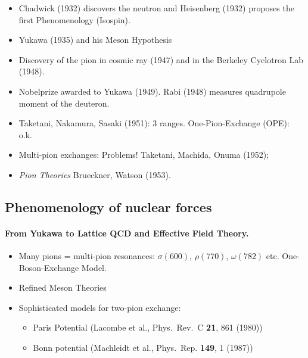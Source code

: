 \documentclass[%
twoside,                 %
final,                   %
10pt]{article}
\begin{document}
\begin{itemize}
\item Chadwick (1932) discovers the neutron and Heisenberg (1932) proposes the first Phenomenology (Isospin).  

\item Yukawa (1935) and his Meson Hypothesis       

\item Discovery of the pion in cosmic ray (1947) and in the Berkeley Cyclotron Lab (1948).

\item Nobelprize awarded to Yukawa (1949).  Rabi (1948) measures quadrupole moment of the deuteron.

\item Taketani, Nakamura, Sasaki (1951): 3 ranges.      One-Pion-Exchange (OPE): o.k.

\item Multi-pion exchanges: Problems!   Taketani, Machida, Onuma (1952);

\item \emph{Pion Theories} Brueckner, Watson (1953).
\end{itemize}

\noindent



\subsection*{Phenomenology of nuclear forces}

\paragraph{From Yukawa to Lattice QCD and Effective Field Theory.}

\begin{itemize}
\item Many pions = multi-pion resonances: $\sigma(600)$,  $\rho(770)$,  $\omega(782)$ etc. One-Boson-Exchange Model.

\item Refined Meson Theories

\item Sophisticated models for two-pion exchange:
\begin{itemize}

      \item Paris Potential (Lacombe et al., Phys.~Rev.~C \textbf{21}, 861 (1980))

      \item Bonn potential (Machleidt et al., Phys.~Rep. \textbf{149}, 1 (1987))
\end{itemize}

\noindent
\end{itemize}
\end{document}
